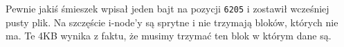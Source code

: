 Pewnie jakiś śmieszek wpisał jeden bajt na pozycji \texttt{6205} i zostawił wcześniej pusty plik.
Na szczęście i-node'y są sprytne i nie trzymają bloków, których nie ma.
Te 4KB wynika z faktu, że musimy trzymać ten blok w którym dane są.